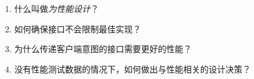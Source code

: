 \begin{enumerate}
\item 
什么叫做\textit{为性能设计}？

\item 
如何确保接口不会限制最佳实现？

\item 
为什么传递客户端意图的接口需要更好的性能？

\item
没有性能测试数据的情况下，如何做出与性能相关的设计决策？

\end{enumerate}